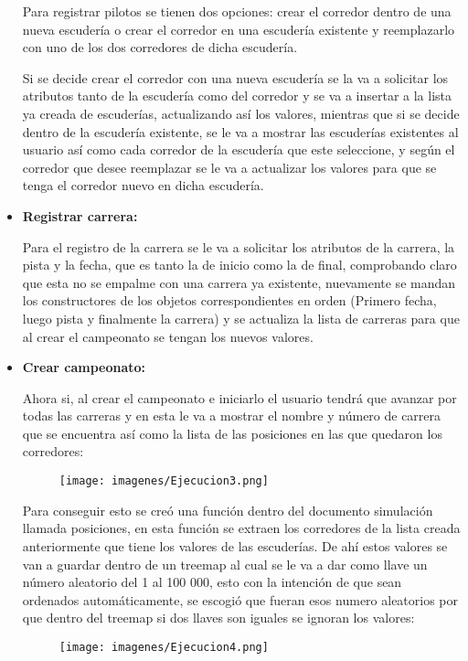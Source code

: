 \documentclass[12pt, letterpaper]{article} %
\begin{document}
\begin{itemize}
    Para registrar pilotos se tienen dos opciones: crear el corredor dentro de una nueva escudería o crear el corredor en una escudería existente y reemplazarlo con uno de los dos corredores de dicha escudería.
    \vspace{5mm}
        
    Si se decide crear el corredor con una nueva escudería se la va a solicitar los atributos tanto de la escudería como del corredor y se va a insertar a la lista ya creada de escuderías, actualizando así los valores, mientras que si se decide dentro de la escudería existente, se le va a mostrar las escuderías existentes al usuario así como cada corredor de la escudería que este seleccione, y según el corredor que desee reemplazar se le va a actualizar los valores para que se tenga el corredor nuevo en dicha escudería.

    \item \textbf{Registrar carrera:}
    
    Para el registro de la carrera se le va a solicitar los atributos de la carrera, la pista y la fecha, que es tanto la de inicio como la de final, comprobando claro que esta no se empalme con una carrera ya existente, nuevamente se mandan los constructores de los objetos correspondientes en orden (Primero fecha, luego pista y finalmente la carrera) y se actualiza la lista de carreras para que al crear el campeonato se tengan los nuevos valores.
    \vspace{10mm}

    \item \textbf{Crear campeonato:}

    Ahora si, al crear el campeonato e iniciarlo el usuario tendrá que avanzar por todas las carreras y en esta le va a mostrar el nombre y número de carrera que se encuentra así como la lista de las posiciones en las que quedaron los corredores:

    \begin{figure}[h]
        \centering
        \texttt{[image: imagenes/Ejecucion3.png]}
        \label{fig:e3}
    \end{figure}
    Para conseguir esto se creó una función dentro del documento simulación llamada posiciones, en esta función se extraen los corredores de la lista creada anteriormente que tiene los valores de las escuderías. De ahí estos valores se van a guardar dentro de un treemap al cual se le va a dar como llave un número aleatorio del 1 al 100 000, esto con la intención de que sean ordenados automáticamente, se escogió que fueran esos numero aleatorios por que dentro del treemap si dos llaves son iguales se ignoran los valores:
    \begin{figure}[h]
        \centering
        \texttt{[image: imagenes/Ejecucion4.png]}
        \label{fig:e4}
    \end{figure}
    \vspace{5mm}
    

\end{itemize}
\end{document}

